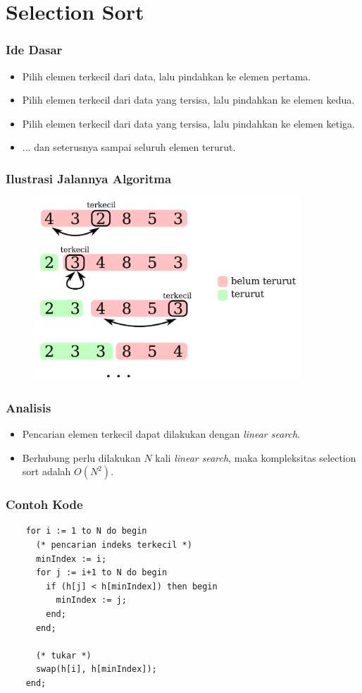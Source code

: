 \section{Selection Sort}
\frame{\sectionpage}

\begin{frame}
\frametitle{Ide Dasar}
  \begin{itemize}
    \item Pilih elemen terkecil dari data, lalu pindahkan ke elemen pertama.
    \item Pilih elemen terkecil dari data yang tersisa, lalu pindahkan ke  elemen kedua.
    \item Pilih elemen terkecil dari data yang tersisa, lalu pindahkan ke elemen ketiga.
    \item ... dan seterusnya sampai seluruh elemen terurut.
  \end{itemize}
\end{frame}

\begin{frame}
\frametitle{Ilustrasi Jalannya Algoritma}
  \begin{figure}
    \includegraphics[width=10cm]{asset/selection-sort.pdf}
  \end{figure}
\end{frame}
    
\begin{frame}
\frametitle{Analisis}
  \begin{itemize}
    \item Pencarian elemen terkecil dapat dilakukan dengan \textit{linear search}.
    \item Berhubung perlu dilakukan $N$ kali \textit{linear search}, maka kompleksitas selection sort adalah $O(N^2)$.
  \end{itemize}
\end{frame}

\begin{frame}[fragile]
\frametitle{Contoh Kode}
  \begin{lstlisting}
    for i := 1 to N do begin
      (* pencarian indeks terkecil *)
      minIndex := i;
      for j := i+1 to N do begin
        if (h[j] < h[minIndex]) then begin
          minIndex := j;
        end;
      end;
    
      (* tukar *)
      swap(h[i], h[minIndex]);
    end;
  \end{lstlisting}
\end{frame}

